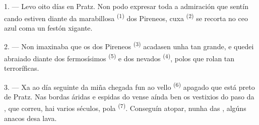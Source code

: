 %
%

\VUsaut{4.0mm}
\VUsaut{3.0mm}

\VUsaut{3.0mm}

\VUsaut{3.0mm}

1. --- Levo oito días en Pratz. Non podo expresar toda a admiración que sentín cando
estiven diante da marabillosa  \textsuperscript{(1)} dos Pireneos, cuxa
 \textsuperscript{(2)} se recorta no ceo azul coma un festón xigante.

2. --- Non imaxinaba que os  dos Pireneos \textsuperscript{(3)}
acadasen unha  tan grande, e quedei abraiado diante dos fermosísimos
 \textsuperscript{(5)} e dos  nevados
\textsuperscript{(4)}, polos que rolan  tan terroríficas.

\VUsaut{3.0mm}
\VUsaut{3.0mm}

3. --- Xa ao día seguinte da miña chegada fun ao vello 
\textsuperscript{(6)} apagado que está preto de Pratz. Nas bordas áridas e espidas do
 vense aínda ben os vestixios do paso da , que correu,
hai varios séculos, pola  \textsuperscript{(7)}. Conseguín
atopar, nunha das , algúns anacos desa lava.

